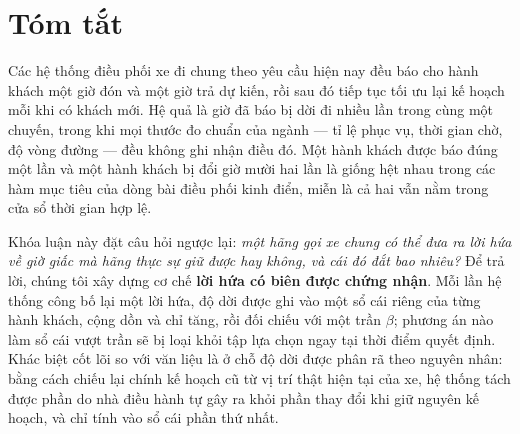 \chapter*{Tóm tắt}

Các hệ thống điều phối xe đi chung theo yêu cầu hiện nay đều báo cho hành khách một giờ đón
và một giờ trả dự kiến, rồi sau đó tiếp tục tối ưu lại kế hoạch mỗi khi có khách mới. Hệ quả
là giờ đã báo bị dời đi nhiều lần trong cùng một chuyến, trong khi mọi thước đo chuẩn của
ngành --- tỉ lệ phục vụ, thời gian chờ, độ vòng đường --- đều không ghi nhận điều đó. Một
hành khách được báo đúng một lần và một hành khách bị đổi giờ mười hai lần là giống hệt nhau
trong các hàm mục tiêu của dòng bài điều phối kinh điển, miễn là cả hai vẫn nằm trong cửa sổ
thời gian hợp lệ.

Khóa luận này đặt câu hỏi ngược lại: \emph{một hãng gọi xe chung có thể đưa ra lời hứa về giờ
giấc mà hãng thực sự giữ được hay không, và cái đó đắt bao nhiêu?} Để trả lời, chúng tôi xây
dựng cơ chế \textbf{lời hứa có biên được chứng nhận}. Mỗi lần hệ thống công bố lại một lời
hứa, độ dời được ghi vào một sổ cái riêng của từng hành khách, cộng dồn và chỉ tăng, rồi đối
chiếu với một trần $\beta$; phương án nào làm sổ cái vượt trần sẽ bị loại khỏi tập lựa chọn
ngay tại thời điểm quyết định. Khác biệt cốt lõi so với văn liệu là ở chỗ độ dời được phân rã
theo nguyên nhân: bằng cách chiếu lại chính kế hoạch cũ từ vị trí thật hiện tại của xe, hệ
thống tách được phần do nhà điều hành tự gây ra khỏi phần thay đổi khi giữ nguyên kế hoạch, và
chỉ tính vào sổ cái phần thứ nhất.

